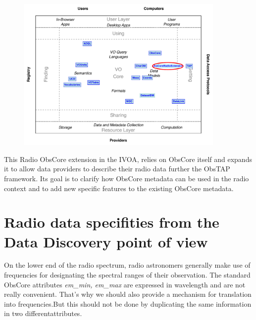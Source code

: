 \documentclass[11pt,a4paper]{ivoa}
\begin{document}
\begin{figure}
\includegraphics[width=0.9\textwidth]{role_diagram.pdf}
\label{fig:architecture}
\end{figure}

This Radio ObsCore extension in the IVOA, relies  on ObsCore itself and expands it
to allow data providers to describe their radio data further the  ObsTAP framework.
Its goal is to clarify how  ObsCore metadata  can be used in the  radio context and to add new specific features to the existing ObsCore metadata.


\section{Radio data specifities from the Data Discovery point of view}
\label{sec:specificities}


On the lower end of the radio spectrum, radio astronomers generally make use of
frequencies for designating the spectral ranges of their observation. The standard
ObsCore attributes \emph{em\_min, em\_max} are expressed in wavelength and are not really convenient.
That's why we should also provide a mechanism for  translation into frequencies.But this should not be done by duplicating the same information in two differentattributes. 
\end{document}
